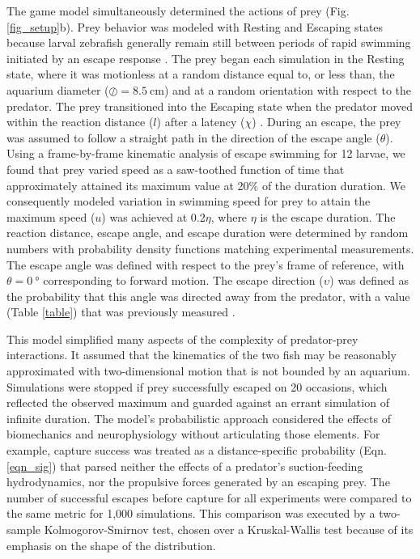 \documentclass[]{rsos}%
\begin{document}
The game model simultaneously determined the actions of prey (Fig. \ref{fig_setup}b).
Prey behavior was modeled with Resting and Escaping states because larval zebrafish generally remain still between periods of rapid swimming initiated by an escape response \cite{Stewart:2013bha, Stewart:2014cma}. 
The prey began each simulation in the Resting state, where it was motionless at a random distance equal to, or less than, the aquarium diameter ($\oslash = \SI{8.5}{\cm}$) and at a random orientation with respect to the predator.
The prey transitioned into the Escaping state when the predator moved within the reaction distance ($l$) after a latency ($\chi$) \cite{Nair:2015gk}.
During an escape, the prey was assumed to follow a straight path in the direction of the escape angle ($\theta$).
Using a frame-by-frame kinematic analysis of escape swimming for 12 larvae, we found that prey varied speed as a saw-toothed function of time that approximately attained its maximum value at 20\% of the duration duration. 
We consequently modeled variation in swimming speed for prey to attain the maximum speed ($u$) was achieved at 0.2$\eta$, where $\eta$ is the escape duration. 
The reaction distance, escape angle, and escape duration were determined by random numbers with probability density functions matching experimental measurements.
The escape angle was defined with respect to the prey's frame of reference, with $\theta =  \SI{0}{\degree}$ corresponding to forward motion.
The escape direction ($\upsilon$) was defined as the probability that this angle was directed away from the predator, with a value (Table \ref{table}) that was previously measured \cite{Stewart:2014cma}.

This model simplified many aspects of the complexity of predator-prey interactions.
It assumed that the kinematics of the two fish may be reasonably approximated with two-dimensional motion that is not bounded by an aquarium. 
Simulations were stopped if prey successfully escaped on 20 occasions, which reflected the observed maximum and guarded against an errant simulation of infinite duration.
The model's probabilistic approach considered the effects of biomechanics and neurophysiology without articulating those elements.
For example, capture success was treated as a distance-specific probability (Eqn. \ref{eqn_sig}) that parsed neither the effects of a predator's suction-feeding hydrodynamics, nor the propulsive forces generated by an escaping prey.
The number of successful escapes before capture for all experiments were compared to the same metric for 1,000 simulations.  
This comparison was executed by a two-sample Kolmogorov-Smirnov test, chosen over a Kruskal-Wallis test because of its emphasis on the shape of the distribution.  
\end{document}
